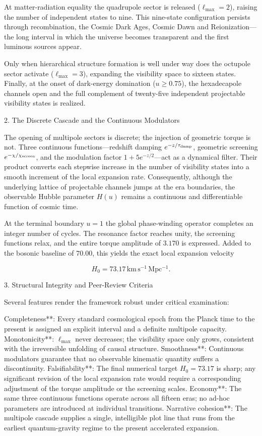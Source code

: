 At matter-radiation equality the quadrupole sector is released (\(\ell_{\max} = 2\)), raising the number of independent states to nine. This nine-state configuration persists through recombination, the Cosmic Dark Ages, Cosmic Dawn and Reionization—the long interval in which the universe becomes transparent and the first luminous sources appear.  

Only when hierarchical structure formation is well under way does the octupole sector activate (\(\ell_{\max} = 3\)), expanding the visibility space to sixteen states. Finally, at the onset of dark-energy domination (\(u \ge 0.75\)), the hexadecapole channels open and the full complement of twenty-five independent projectable visibility states is realized.

2. The Discrete Cascade and the Continuous Modulators

The opening of multipole sectors is discrete; the injection of geometric torque is not. Three continuous functions—redshift damping \(e^{-z/\tau_{\rm damp}}\), geometric screening \(e^{-\chi/\chi_{\rm screen}}\), and the modulation factor \(1+5e^{-z/2}\)—act as a dynamical filter. Their product converts each stepwise increase in the number of visibility states into a smooth increment of the local expansion rate. Consequently, although the underlying lattice of projectable channels jumps at the era boundaries, the observable Hubble parameter \(H(u)\) remains a continuous and differentiable function of cosmic time.

At the terminal boundary \(u = 1\) the global phase-winding operator completes an integer number of cycles. The resonance factor reaches unity, the screening functions relax, and the entire torque amplitude of \(3.170\) is expressed. Added to the bosonic baseline of \(70.00\), this yields the exact local expansion velocity

\[
H_0 = 73.17\,\mathrm{km\,s^{-1}\,Mpc^{-1}}.
\]

3. Structural Integrity and Peer-Review Criteria

Several features render the framework robust under critical examination:

Completeness**: Every standard cosmological epoch from the Planck time to the present is assigned an explicit interval and a definite multipole capacity.  
Monotonicity**: \(\ell_{\max}\) never decreases; the visibility space only grows, consistent with the irreversible unfolding of causal structure.  
Smoothness**: Continuous modulators guarantee that no observable kinematic quantity suffers a discontinuity.  
Falsifiability**: The final numerical target \(H_0 = 73.17\) is sharp; any significant revision of the local expansion rate would require a corresponding adjustment of the torque amplitude or the screening scales.  
Economy**: The same three continuous functions operate across all fifteen eras; no ad-hoc parameters are introduced at individual transitions.  
Narrative cohesion**: The multipole cascade supplies a single, intelligible plot line that runs from the earliest quantum-gravity regime to the present accelerated expansion.

